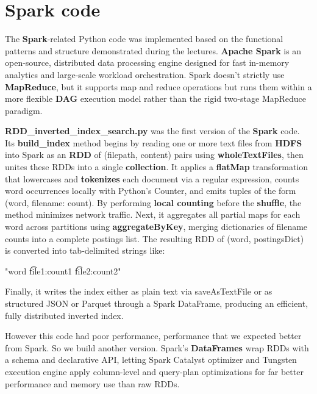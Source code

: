 \section{Spark code}
The \textbf{Spark}-related Python code was implemented based on the functional patterns and structure demonstrated during the lectures. \textbf{Apache Spark} is an open-source, distributed data processing engine designed for fast in-memory analytics and large-scale workload orchestration. Spark doesn’t strictly use \textbf{MapReduce}, but it supports map and reduce operations but runs them within a more flexible \textbf{DAG} execution model rather than the rigid two-stage MapReduce paradigm.

\vspace{4mm}

\textbf{RDD\_inverted\_index\_search.py} was the first version of the \textbf{Spark} code. Its \textbf{build\_index} method begins by reading one or more text files from \textbf{HDFS} into Spark as an \textbf{RDD} of (filepath, content) pairs using \textbf{wholeTextFiles}, then unites these RDDs into a single \textbf{collection}. It applies a \textbf{flatMap} transformation that lowercases and \textbf{tokenizes} each document via a regular expression, counts word occurrences locally with Python’s Counter, and emits tuples of the form (word, {filename: count}). By performing \textbf{local counting} before the \textbf{shuffle}, the method minimizes network traffic. Next, it aggregates all partial maps for each word across partitions using \textbf{aggregateByKey}, merging dictionaries of filename counts into a complete postings list. The resulting RDD of (word, postingsDict) is converted into tab‐delimited strings like:

"word \t file1:count1 \t file2:count2"

Finally, it writes the index either as plain text via saveAsTextFile or as structured JSON or Parquet through a Spark DataFrame, producing an efficient, fully distributed inverted index. 

\vspace{4mm}

However this code had poor performance, performance that we expected better from Spark. So we build another version. Spark's \textbf{DataFrames} wrap RDDs with a schema and declarative API, letting Spark Catalyst optimizer and Tungsten execution engine apply column-level and query-plan optimizations for far better performance and memory use than raw RDDs. 

\vspace{4mm}


